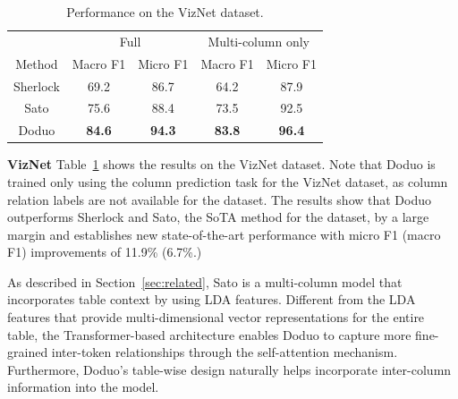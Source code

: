 \documentclass[sigconf]{acmart}
\newcommand{\name}{\mbox{\sc Doduo}}
\begin{document}
\begin{table}[t]
\centering
\footnotesize
\caption{Performance on the VizNet dataset.}\label{tab:sato_main}
\vspace{-1em}
\begin{tabular}{c|cc|cc}\hline
 & \multicolumn{2}{c|}{Full} & \multicolumn{2}{c}{Multi-column only} \\
 Method & Macro F1 & Micro F1 & Macro F1 & Micro F1 \\\hline\hline
Sherlock &  69.2 & 86.7 & 64.2 & 87.9\\
Sato & 75.6 & 88.4 & 73.5 & 92.5\\
\name  & {\bf 84.6} & {\bf 94.3} & {\bf 83.8} & {\bf 96.4} \\\hline
\end{tabular}
    \vspace{-1em}
\end{table}



\noindent
{\bf VizNet} Table~\ref{tab:sato_main} shows the results on the VizNet dataset. Note that \name{} is trained only using the column prediction task for the VizNet dataset, as column relation labels are not available for the dataset.
%
The results show that \name{} outperforms Sherlock and Sato, the SoTA method for the dataset, by a large margin and establishes new state-of-the-art performance with micro F1 (macro F1) improvements of 11.9\% (6.7\%.)

As described in Section~\ref{sec:related},
Sato is a multi-column model that incorporates table context by using LDA features.
%
Different from the LDA features that provide multi-dimensional vector representations for the entire table, the Transformer-based architecture enables \name{} to capture more fine-grained inter-token relationships through the self-attention mechanism. Furthermore, \name's table-wise design naturally helps incorporate inter-column information into the model.
\end{document}
